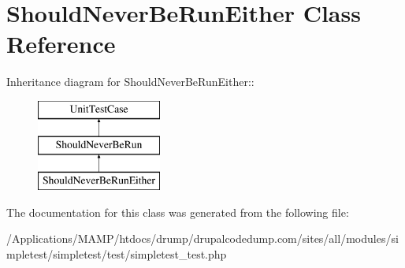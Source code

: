 \hypertarget{class_should_never_be_run_either}{
\section{ShouldNeverBeRunEither Class Reference}
\label{class_should_never_be_run_either}
}
Inheritance diagram for ShouldNeverBeRunEither::\begin{figure}[H]
\begin{center}
\leavevmode
\includegraphics[height=3cm]{class_should_never_be_run_either}
\end{center}
\end{figure}


The documentation for this class was generated from the following file:\begin{DoxyCompactItemize}
\item 
/Applications/MAMP/htdocs/drump/drupalcodedump.com/sites/all/modules/simpletest/simpletest/test/simpletest\_\-test.php\end{DoxyCompactItemize}
